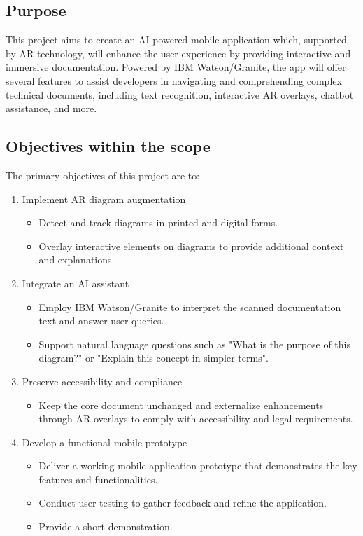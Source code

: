 \documentclass[10pt]{article}
\begin{document}
    \subsection{Purpose}
    This project aims to create an AI-powered mobile application which, supported by AR technology, will enhance the user experience
    by providing interactive and immersive documentation. Powered by IBM Watson/Granite, the app will offer several features to assist developers in navigating and comprehending complex technical documents, including text recognition,
    interactive AR overlays, chatbot assistance, and more.

    \subsection{Objectives within the scope}
    The primary objectives of this project are to:
    \begin{enumerate}
        \item Implement AR diagram augmentation
        \begin{itemize}
            \item Detect and track diagrams in printed and digital forms.
            \item Overlay interactive elements on diagrams to provide additional context and explanations.
        \end{itemize}
        \item Integrate an AI assistant
    \begin{itemize}
        	\item Employ IBM Watson/Granite to interpret the scanned documentation text and answer user queries.
        	\item Support natural language questions such as "What is the purpose of this diagram?" or "Explain this concept in simpler terms".
    \end{itemize}
    \item Preserve accessibility and compliance
        \begin{itemize}
            \item Keep the core document unchanged and externalize enhancements through AR overlays to comply with accessibility and legal requirements.
        \end{itemize}
        \item Develop a functional mobile prototype
        \begin{itemize}
            \item Deliver a working mobile application prototype that demonstrates the key features and functionalities.
            \item Conduct user testing to gather feedback and refine the application.
            \item Provide a short demonstration.
        \end{itemize}
        \end{enumerate}
\end{document}
